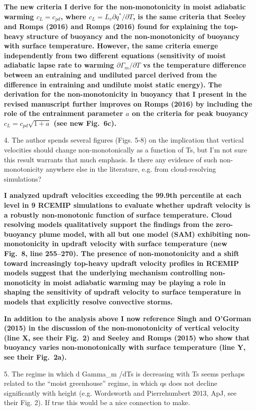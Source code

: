 \documentclass{article}
\begin{document}
\par
\textbf{The new criteria I derive for the non-monotonicity in moist adiabatic warming $c_L=c_{pd}$, where $c_L=L_v\partial q^* / \partial T$, is the same criteria that Seeley and Romps (2016) and Romps (2016) found for explaining the top-heavy structure of buoyancy and the non-monotonicity of buoyancy with surface temperature. However, the same criteria emerge independently from two different equations (sensitivity of moist adiabatic lapse rate to warming $\partial \Gamma_m / \partial T$ vs the temperature difference between an entraining and undiluted parcel derived from the difference in entraining and undilute moist static energy). The derivation for the non-monotonicity in buoyancy that I present in the revised manuscript further improves on Romps (2016) by including the role of the entrainment parameter $a$ on the criteria for peak buoyancy $c_L=c_{pd}\sqrt{1+a}$ (see new Fig.~6c).}
\par
4. The author spends several figures (Figs. 5-8) on the implication that vertical velocities should change non-monotonically as a function of Ts, but I'm not sure this result warrants that much emphasis. Is there any evidence of such non-monotonicity anywhere else in the literature, e.g. from cloud-resolving simulations?
\par
\textbf{I analyzed updraft velocities exceeding the 99.9th percentile at each level in 9 RCEMIP simulations to evaluate whether updraft velocity is a robustly non-monotonic function of surface temperature. Cloud resolving models qualitatively support the findings from the zero-buoyancy plume model, with all but one model (SAM) exhibiting non-monotonicity in updraft velocity with surface temperature (new Fig.~8, line 255--270). The presence of non-monotonicity and a shift toward increasingly top-heavy updraft velocity profiles in RCEMIP models suggest that the underlying mechanism controlling non-monoticity in moist adiabatic warming may be playing a role in shaping the sensitivity of updraft velocity to surface temperature in models that explicitly resolve convective storms.}
\par
\textbf{In addition to the analysis above I now reference Singh and O'Gorman (2015) in the discussion of the non-monotonicity of vertical velocity (line X, see their Fig.~2) and Seeley and Romps (2015) who show that buoyancy varies non-monotonically with surface temperature (line Y, see their Fig.~2a).}
\par
5. The regime in which d Gamma\_m /dTs is decreasing with Ts seems perhaps related to the ``moist greenhouse'' regime, in which qs does not decline significantly with height (e.g. Wordsworth and Pierrehumbert 2013, ApJ, see their Fig. 2). If true this would be a nice connection to make.
\par
\textbf{}
\end{document}
